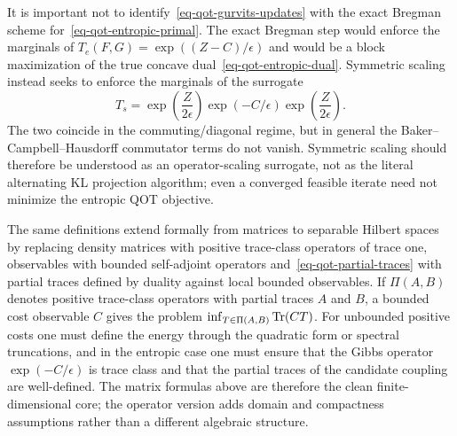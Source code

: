 \begin{rem}
	It is important not to identify~\eqref{eq-qot-gurvits-updates} with the exact Bregman scheme for~\eqref{eq-qot-entropic-primal}. The exact Bregman step would enforce the marginals of $T_e(F,G)=\exp((Z-C)/\epsilon)$ and would be a block maximization of the true concave dual~\eqref{eq-qot-entropic-dual}. Symmetric scaling instead seeks to enforce the marginals of the surrogate
\[
	T_s=
	\exp\!\left(\frac{Z}{2\epsilon}\right)
	\exp(-C/\epsilon)
	\exp\!\left(\frac{Z}{2\epsilon}\right).
\]
		The two coincide in the commuting/diagonal regime, but in general the Baker--Campbell--Hausdorff commutator terms do not vanish. Symmetric scaling should therefore be understood as an operator-scaling surrogate, not as the literal alternating KL projection algorithm; even a converged feasible iterate need not minimize the entropic QOT objective.
\end{rem}

\begin{rem}
	The same definitions extend formally from matrices to separable Hilbert spaces by replacing density matrices with positive trace-class operators of trace one, observables with bounded self-adjoint operators and~\eqref{eq-qot-partial-traces} with partial traces defined by duality against local bounded observables. If $\Pi(A,B)$ denotes positive trace-class operators with partial traces $A$ and $B$, a bounded cost observable $C$ gives the problem $\inf_{T\in\Pi(A,B)}\operatorname{Tr}(CT)$. For unbounded positive costs one must define the energy through the quadratic form or spectral truncations, and in the entropic case one must ensure that the Gibbs operator $\exp(-C/\epsilon)$ is trace class and that the partial traces of the candidate coupling are well-defined. The matrix formulas above are therefore the clean finite-dimensional core; the operator version adds domain and compactness assumptions rather than a different algebraic structure.
\end{rem}

